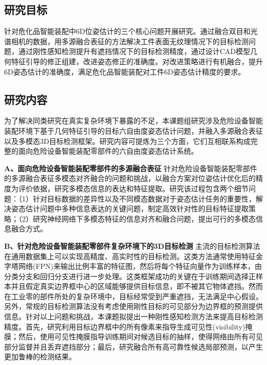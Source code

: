 \documentclass[12pt]{article}
\begin{document}
{


}



\subsection{研究目标}
针对危化品智能装配中6D位姿估计的三个核心问题开展研究。通过融合双目和光谱相机的数据，用多源融合表征的方法解决工件表面无纹理情况下的目标检测问题，通过刚性感知检测提升有遮挡情况下的目标检测精度，通过设计CAD模型几何特征引导的修正组建，改进姿态修正的准确度。对改进策略进行有机融合，提升6D姿态估计的准确度，满足危化品智能装配对工件6D姿态估计精度的要求。





\subsection{研究内容}

为了解决同类研究在真实复杂环境下暴露的不足，本课题组研究涉及危险设备智能装配环境下基于几何特征引导的目标六自由度姿态估计问题，并融入多源融合表征以及多模态3D目标检测框架。研究内容可提炼为三个方面，它们互相联系构成完整的面向危险设备智能装配零部件的六自由度姿态估计系统。

\textbf{A、面向危险设备智能装配零部件的多源融合表征}
针对危险设备智能装配零部件的多源融合表征多模态对齐融合的问题和挑战，以融合方案对位姿估计优化后的精度为评价依据，研究多模态信息的表达和特征提取。研究该过程包含两个细节问题：（1）针对目标数据的差异性以及不同模态数据对于姿态估计任务的重要性，解决姿态估计问题中多种信息表达的关键问题，制定高效针对性的目标特征提取策略；（2）研究神经网络下多模态特征的信息对齐和融合问题，提出可行的多模态信息融合方式。

\textbf{B、针对危险设备智能装配零部件复杂环境下的3D目标检测}
主流的目标检测算法在通用数据集上可以实现高精度、高实时性的目标检测。这类方法通常使用特征金字塔网络(FPN)来输出比例丰富的特征图，然后将每个特征向量作为训练样本，由分类分支和回归分支进行进一步处理。这类框架成功的关键在于训练期间选择正样本并且假定真实边界框中心的区域能够提供目标信息，即不被其它物体遮挡。然而在工业零的部件所处的复杂环境中，目标经常受到严重遮挡，无法满足中心假设。另外，常规的目标检测算法没有考虑使用刚性目标的可见部分为边界框的预测提供信息。针对以上问题和挑战，本课题拟提出一种刚性感知检测方法来提高目标检测精度。首先，研究利用目标边界框中的所有像素来指导生成可见性(visibility)掩膜；然后，使用可见性掩膜指导训练期间对候选目标的抽样，使得网络由所有可见部分监督并且丢弃遮挡部分；最后，研究融合所有高可靠性候选局部预测，以产生更加鲁棒的检测结果。
\end{document}

